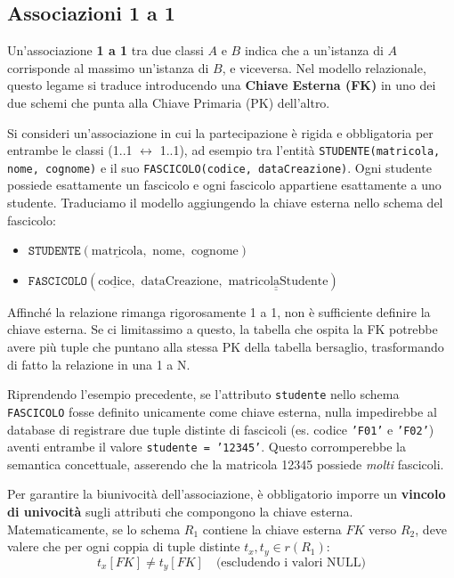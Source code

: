 \subsection{Associazioni 1 a 1}

Un'associazione \textbf{1 a 1} tra due classi $A$ e $B$ indica che a un'istanza di $A$ corrisponde al massimo un'istanza di $B$, e viceversa. 
Nel modello relazionale, questo legame si traduce introducendo una \textbf{Chiave Esterna (FK)} in uno dei due schemi che punta alla Chiave Primaria (PK) dell'altro.

\begin{example}
Si consideri un'associazione in cui la partecipazione è rigida e obbligatoria per entrambe le classi (1..1 $\leftrightarrow$ 1..1), ad esempio tra l'entità \texttt{STUDENTE(matricola, nome, cognome)} e il suo \texttt{FASCICOLO(codice, dataCreazione)}. Ogni studente possiede esattamente un fascicolo e ogni fascicolo appartiene esattamente a uno studente.
Traduciamo il modello aggiungendo la chiave esterna nello schema del fascicolo:
\begin{itemize}
    \item $\texttt{STUDENTE}(\underline{\text{matricola}}, \text{ nome}, \text{ cognome})$
    \item $\texttt{FASCICOLO}(\underline{\text{codice}}, \text{ dataCreazione}, \underline{\underline{\text{ matricolaStudente}}})$
\end{itemize}
\end{example}

Affinché la relazione rimanga rigorosamente 1 a 1, non è sufficiente definire la chiave esterna. Se ci limitassimo a questo, la tabella che ospita la FK potrebbe avere più tuple che puntano alla stessa PK della tabella bersaglio, trasformando di fatto la relazione in una 1 a N.

Riprendendo l'esempio precedente, se l'attributo \texttt{studente} nello schema \texttt{FASCICOLO} fosse definito unicamente come chiave esterna, nulla impedirebbe al database di registrare due tuple distinte di fascicoli (es. codice \texttt{'F01'} e \texttt{'F02'}) aventi entrambe il valore \texttt{studente = '12345'}. Questo corromperebbe la semantica concettuale, asserendo che la matricola 12345 possiede \textit{molti} fascicoli.

Per garantire la biunivocità dell'associazione, è obbligatorio imporre un \textbf{vincolo di univocità} sugli attributi che compongono la chiave esterna.
Matematicamente, se lo schema $R_1$ contiene la chiave esterna $FK$ verso $R_2$, deve valere che per ogni coppia di tuple distinte $t_x, t_y \in r(R_1)$:
$$t_x[FK] \neq t_y[FK] \quad \text{(escludendo i valori NULL)}$$


